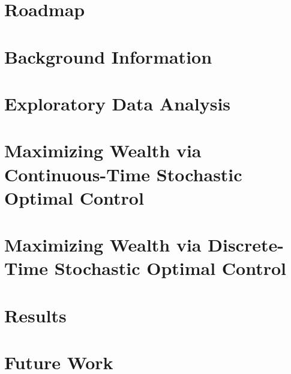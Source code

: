 \documentclass{beamer}
\begin{document}
    \maketitle
    \section*{Roadmap}

    \section{Background Information}
    
    
    \section{Exploratory Data Analysis}
    
    
    \section{Maximizing Wealth via Continuous-Time Stochastic Optimal Control}
    
    
    \section{Maximizing Wealth via Discrete-Time Stochastic Optimal Control}
    

    \section{Results}
    
    
    \section{Future Work}
    
    
\end{document}
